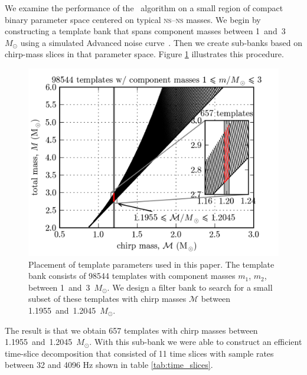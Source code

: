 We examine the performance of the \lloid\ algorithm on a small region of
compact binary parameter space centered on typical \textsc{ns}--\textsc{ns}
masses.  We begin by constructing a template bank that spans component masses
between 1~and~3~$M_\odot$ using a simulated Advanced \LIGO{} noise
curve~\cite{lal}.  Then we create sub-banks based on chirp-mass slices in that
parameter space.  Figure \ref{fig:tmpltbank} illustrates this procedure.
\begin{figure}[htbp]
	\begin{center}
		\includegraphics{figures/tmpltbank.png}
		\caption{\label{fig:tmpltbank}Placement of template parameters used in this paper.  The template bank consists of 98544 templates with component masses $m_1$, $m_2$, between 1~and~3~$M_\odot$.  We design a filter bank to search for a small subset of these templates with chirp masses $\mathcal M$ between 1.1955~and~1.2045~$M_\odot$.}
	\end{center}
\end{figure}
The result is that we obtain 657 templates with chirp masses between 1.1955~and~1.2045~$M_\odot$.  With this
sub-bank we were able to construct an efficient time-slice decomposition that consisted of 11 time slices
with sample rates between 32 and 4096 Hz shown in table \ref{tab:time_slices}.
